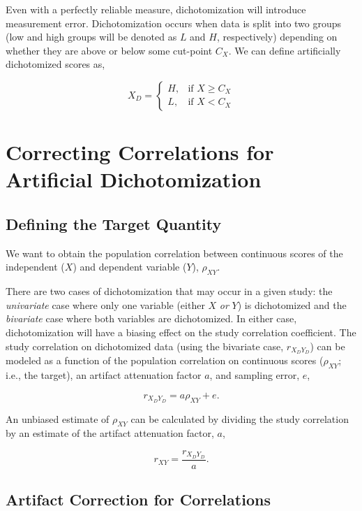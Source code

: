 \documentclass[
  letterpaper,
  DIV=11,
  numbers=noendperiod]{scrreprt}
\begin{document}
Even with a perfectly reliable measure, dichotomization will introduce
measurement error. Dichotomization occurs when data is split into two
groups (low and high groups will be denoted as \(L\) and \(H\),
respectively) depending on whether they are above or below some
cut-point \(C_X\). We can define artificially dichotomized scores as,

\[
X_D= 
\begin{cases}
    H,& \text{if } X\geq C_X\\
    L,& \text{if } X<C_X
\end{cases}
\]

\hypertarget{correcting-correlations-for-artificial-dichotomization}{%
\section{Correcting Correlations for Artificial
Dichotomization}\label{correcting-correlations-for-artificial-dichotomization}}

\hypertarget{defining-the-target-quantity-3}{%
\subsection{Defining the Target
Quantity}\label{defining-the-target-quantity-3}}

We want to obtain the population correlation between continuous scores
of the independent (\(X\)) and dependent variable (\(Y\)),
\(\rho_{XY}\).

There are two cases of dichotomization that may occur in a given study:
the \emph{univariate} case where only one variable (either \(X\)
\emph{or} \(Y\)) is dichotomized and the \emph{bivariate} case where
both variables are dichotomized. In either case, dichotomization will
have a biasing effect on the study correlation coefficient. The study
correlation on dichotomized data (using the bivariate case,
\(r_{X_D Y_D}\)) can be modeled as a function of the population
correlation on continuous scores (\(\rho_{XY}\); i.e., the target), an
artifact attenuation factor \(a\), and sampling error, \(e\),

\[
r_{X_DY_D} = a\rho_{XY}+e.
\]

An unbiased estimate of \(\rho_{XY}\) can be calculated by dividing the
study correlation by an estimate of the artifact attenuation factor,
\(a\),

\[
r_{XY} = \frac{r_{X_D Y_D}}{a}.
\]

\hypertarget{sec-corr-artifacts}{%
\subsection{Artifact Correction for
Correlations}\label{sec-corr-artifacts}}
\end{document}
